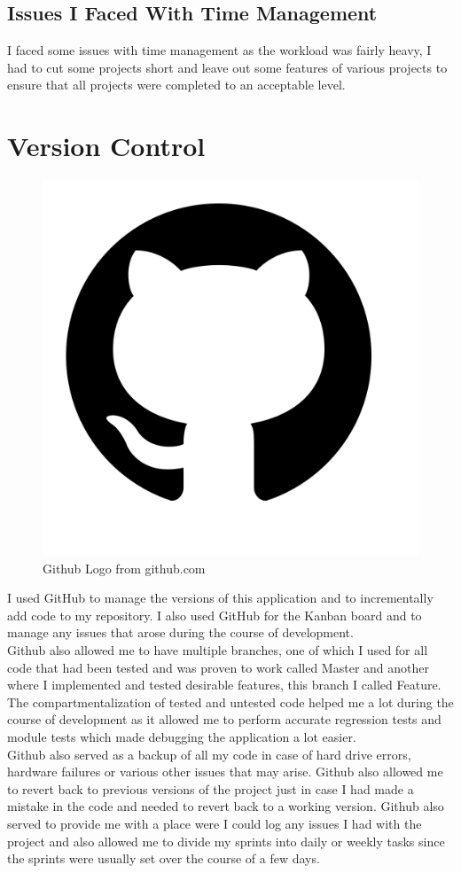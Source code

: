 \subsection{Issues I Faced With Time Management}
I faced some issues with time management as the workload was fairly heavy, I had to cut some projects short and leave out some features of various projects to ensure that all projects were completed to an acceptable level.
\section{Version Control}
\begin{figure}
\includegraphics[width=3\linewidth]{img/github}
\caption{Github Logo from github.com}
\label{fig:wrapfig}
\end{figure}
I used GitHub to manage the versions of this application and to incrementally add code to my repository.
I also used GitHub for the Kanban board and to manage any issues that arose during the course of development.
\\
Github also allowed me to have multiple branches, one of which I used for all code that had been tested and was proven to work called Master and another where I implemented and tested desirable features, this branch I called Feature.  The compartmentalization of tested and untested code helped me a lot during the course of development as it allowed me to perform accurate regression tests and module tests which made
 debugging the application a lot easier.
\\
  Github also served as a backup of all my code in case of hard drive errors, hardware failures or various other issues that may arise.  Github also allowed me to revert back to previous versions of the project just in case I had made a mistake in the code and needed to revert back to a working version.  Github also served to provide me with a place were I could log any issues I had with the project and also allowed me to divide my sprints into daily or weekly tasks since the sprints were usually set over the course of a few days.
